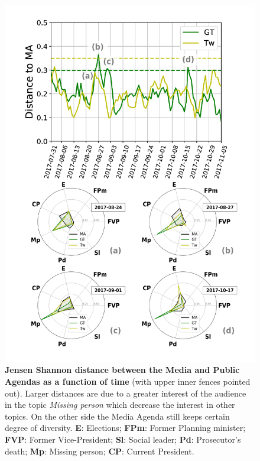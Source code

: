 \documentclass{bmcart}
\begin{document}
\begin{backmatter}
\begin{figure}[h!]
\includegraphics[height = 0.7\textheight]{Fig4.pdf}
\caption{\textbf{Jensen Shannon distance between the Media and Public Agendas as a function of time} (with upper inner fences pointed out). Larger distances are due to a greater interest of the audience in the topic \emph{Missing person} which  decrease the interest in other topics. On the other side the Media Agenda still keeps certain degree of diversity. \textbf{E}: Elections; \textbf{FPm}: Former Planning minister; \textbf{FVP}: Former Vice-President; \textbf{Sl}: Social leader; \textbf{Pd}: Prosecutor's death; \textbf{Mp}: Missing person; \textbf{CP}: Current President.}
\label{fig:jensen_shannon_gt}
\end{figure}


\end{backmatter}
\end{document}
